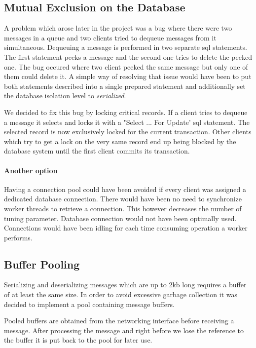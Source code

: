 \documentclass[milestone1.tex]{subfiles}
\begin{document}
\subsection{Mutual Exclusion on the Database}

A problem which arose later in the project was a bug where there were two messages in a queue and two clients tried to dequeue messages from it simultaneous. Dequeuing a message is performed in two separate sql statements. The first statement peeks a message and the second one tries to delete the peeked one. The bug occured where two client peeked the same message but only one of them could delete it. A simple way of resolving that issue would have been to put both statements described into a single prepared statement and additionally set the database isolation level to \textit{serialized}. 

We decided to fix this bug by locking critical records. If a client tries to dequeue a message it selects and locks it with a "Select ... For Update' sql statement. The selected record is now exclusively locked for the current transaction. Other clients which try to get a lock on the very same record end up being blocked by the database system until the first client commits its transaction.

\paragraph{Another option}
Having a connection pool could have been avoided if every client was assigned a dedicated database connection. There would have been no need to synchronize worker threads to retrieve a connection. This however decreases the number of tuning parameter. Database connection would not have been optimally used. Connections would have been idling for each time consuming operation a worker performs.

\subsection{Buffer Pooling}
\label{sub:buffer-pooling}
Serializing and deserializing messages which are up to 2kb long requires a buffer of at least the same size. In order to avoid excessive garbage collection it was decided to implement a pool containing message buffers.

Pooled buffers are obtained from the networking interface before receiving a message. After processing the message and right before we lose the reference to the buffer it is put back to the pool for later use.
\end{document}
